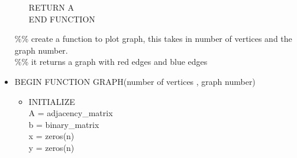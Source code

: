 \documentclass{Assignment}
\begin{document}
\begin{itemize}
\begin{itemize}
	RETURN A\\
\hspace*{-1cm}END FUNCTION\\
	\end{itemize}
\%\% create a function to plot graph, this takes in number of vertices and the graph number.\\
\%\% it returns a graph with red edges and blue edges
\item	BEGIN FUNCTION GRAPH(number of vertices , graph number)\\
\begin{itemize}

\item	INITIALIZE\\
	A = adjacency\_matrix\\
	b = binary\_matrix\\
	x = zeros(n)\\
	y = zeros(n)\\
	

\end{itemize}
\end{itemize}
\end{document}
